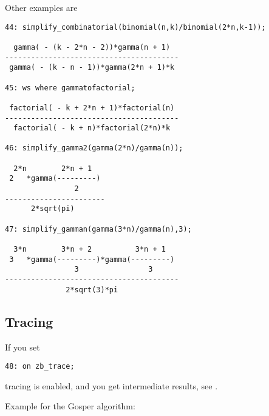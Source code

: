 Other examples are

{\small
\begin{verbatim}
44: simplify_combinatorial(binomial(n,k)/binomial(2*n,k-1));

  gamma( - (k - 2*n - 2))*gamma(n + 1)
----------------------------------------
 gamma( - (k - n - 1))*gamma(2*n + 1)*k

45: ws where gammatofactorial;

 factorial( - k + 2*n + 1)*factorial(n)
----------------------------------------
  factorial( - k + n)*factorial(2*n)*k

46: simplify_gamma2(gamma(2*n)/gamma(n));

  2*n        2*n + 1
 2   *gamma(---------)
                2
-----------------------
      2*sqrt(pi)

47: simplify_gamman(gamma(3*n)/gamma(n),3);

  3*n        3*n + 2          3*n + 1
 3   *gamma(---------)*gamma(---------)
                3                3
----------------------------------------
              2*sqrt(3)*pi
\end{verbatim}
}\noindent

\subsection{Tracing}
\hypertarget{switch:ZB_TRACE}{}

If you set
{\small
\begin{verbatim}
48: on zb_trace;
\end{verbatim}
}\noindent
tracing is enabled, and you get intermediate results, see \cite{Koepf:94b}.

Example for the Gosper algorithm:

